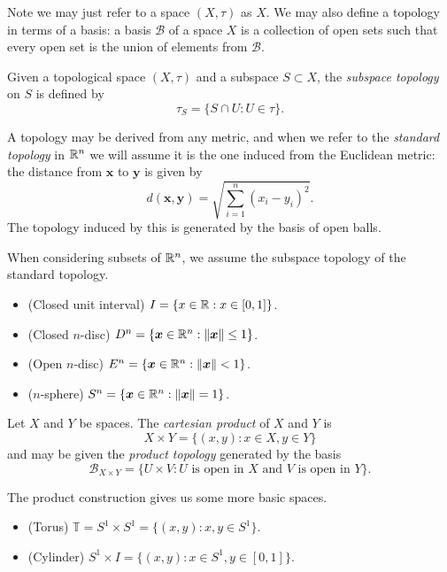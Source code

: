 Note we may just refer to a space $(X, \tau)$ as $X$. We may also define a topology in terms of a basis: a basis $\mathcal B$ of a space $X$ is a collection of open sets such that every open set is the union of elements from $\mathcal B$.

\begin{definition}
  Given a topological space $(X, \tau)$ and a subspace $S \subset X$, the \emph{subspace topology} on $S$ is defined by \[\tau_S = \{S \cap U: U \in \tau\}.\]
\end{definition}

\begin{example}
  A topology may be derived from any metric, and when we refer to the \emph{standard topology} in $\mathbb R^n$ we will assume it is the one induced from the Euclidean metric: the distance from $\bm x$ to $\bm y$ is given by
  \[d(\bm x, \bm y) = \sqrt{\sum_{i=1}^n (x_i - y_i)^2}. \]
  The topology induced by this is generated by the basis of open balls.
\end{example}

\begin{example}
  When considering subsets of $\mathbb R^n$, we assume the subspace topology of the standard topology.
  \begin{itemize}
    \item (Closed unit interval) $I = \{x \in \mathbb R: x \in [0,1]\}$.
    \item (Closed $n$-disc) $D^n = \{\bm x \in \mathbb R^n: \lVert \bm x \rVert \leq 1\}$.
    \item (Open $n$-disc) $E^n = \{\bm x \in \mathbb R^n: \lVert \bm x \rVert < 1\}$.
    \item ($n$-sphere) $S^n = \{\bm x \in \mathbb R^n: \lVert \bm x \rVert = 1\}$.
  \end{itemize}
\end{example}

\begin{definition}
  Let $X$ and $Y$ be spaces. The \emph{cartesian product} of $X$ and $Y$ is
  \[X \times Y = \{(x,y): x \in X, y \in Y\}\]
  and may be given the \emph{product topology} generated by the basis
  \[\mathcal B_{X \times Y} = \{U \times V: \text{$U$ is open in $X$ and $V$ is open in $Y$}\}.\]
\end{definition}

\begin{example}
  The product construction gives us some more basic spaces.
  \begin{itemize}
    \item (Torus) $\mathbb T = S^1 \times S^1 = \{(x, y): x,y \in S^1\}$.
    \item (Cylinder) $S^1 \times I = \{(x, y): x \in S^1, y \in [0,1]\}$.
  \end{itemize}
\end{example}


